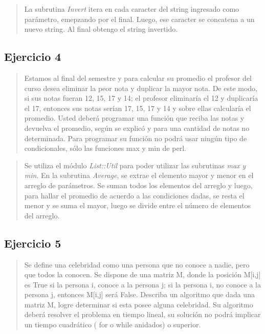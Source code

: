 \documentclass{article}
\begin{document}
  

  \begin{quote}
    La subrutina \textit{Invert} itera en cada caracter del string ingresado como parámetro, emepzando por el final. Luego, ese caracter se concatena a un nuevo string. Al final obtengo el string invertido.
  \end{quote}

  \subsection{Ejercicio 4}

  \begin{quote}
    Estamos al final del semestre y para calcular su promedio el profesor del curso desea eliminar la peor nota y duplicar la mayor nota. De este modo, si sus notas fueran 12, 15, 17 y 14; el profesor eliminaría el 12 y duplicaría el 17, entonces sus notas serían 17, 15, 17 y 14 y sobre ellas calcularía el promedio. Usted deberá programar una función que reciba las notas y devuelva el promedio, según se explicó y para una cantidad de notas no determinada. Para programar su función no podrá usar ningún tipo de condicionales, sólo las funciones max y min de perl.
  \end{quote}

  

  \begin{quote}
    Se utiliza el módulo \textit{List::Util} para poder utilizar las subrutinas \textit{max y min}. En la subrutina \textit{Average}, se extrae el elemento mayor y menor en el arreglo de parámetros. Se suman todos los elementos del arreglo y luego, para hallar el promedio de acuerdo a las condiciones dadas, se resta el menor y se suma el mayor, luego se divide entre el número de elementos del arreglo.
  \end{quote}

  \subsection{Ejercicio 5}

  \begin{quote}
    Se define una celebridad como una persona que no conoce a nadie,  pero que todos la conocen. Se dispone de una matriz M, donde la posición M[i,j] es True si la persona i, conoce a la persona j; si la persona i, no conoce a la persona j,  entonces M[i,j] será False. Describa un algoritmo que dada una matriz M, logre determinar si esta posee alguna celebridad. Su algoritmo deberá resolver el problema en tiempo lineal, su solución no podrá implicar un tiempo cuadrático ( for o while anidados) o superior.

  \end{quote}
\end{document}

